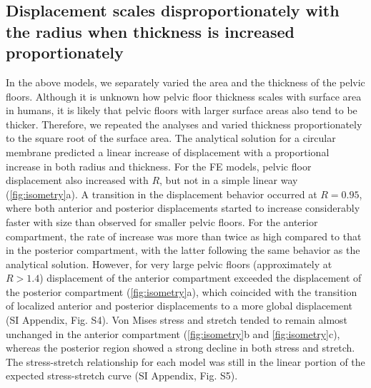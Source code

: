 \documentclass[9pt,twocolumn,twoside]{pnas-new}
\begin{document}
\subsection*{Displacement scales disproportionately with the radius when thickness is increased proportionately}
In the above models, we separately varied the area and the thickness of the pelvic floors. Although it is unknown how pelvic floor thickness scales with surface area in humans, it is likely that pelvic floors with larger surface areas also tend to be thicker. Therefore, we repeated the analyses and varied thickness proportionately to the square root of the surface area.
The analytical solution for a circular membrane predicted a linear increase of displacement with a proportional increase in both radius and thickness. For the FE models, pelvic floor displacement also increased with $R$, but not in a simple linear way (\cref{fig:isometry}a). A transition in the displacement behavior occurred at $R=0.95$, where both anterior and posterior displacements started to increase considerably faster with size than observed for smaller pelvic floors. For the anterior compartment, the rate of increase was more than twice as high compared to that in the posterior compartment, with the latter following the same behavior as the analytical solution. However, for very large pelvic floors (approximately at $R>1.4$) displacement of the anterior compartment exceeded the displacement of the posterior compartment (\cref{fig:isometry}a), which coincided with the transition of localized anterior and posterior displacements to a more global displacement (SI Appendix, Fig. S4). Von Mises stress and stretch tended to remain almost unchanged in the anterior compartment (\cref{fig:isometry}b and \cref{fig:isometry}c), whereas the posterior region showed a strong decline in both stress and stretch. The stress-stretch relationship for each model was still in the linear portion of the expected stress-stretch curve (SI Appendix, Fig. S5).
\end{document}
